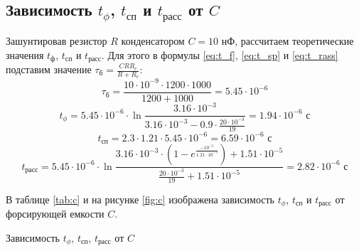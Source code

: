 \documentclass[a4paper,14pt]{extarticle}
\begin{document}
\subsection{Зависимость $t_\phi$, $t_\text{сп}$ и $t_\text{расс}$ от $C$}

Зашунтировав резистор $R$ конденсатором $C = 10$ нФ, рассчитаем теоретические значения $t_\text{ф}$, $t_\text{сп}$ и $t_\text{расс}$. Для этого в формулы \ref{eq:t_f}, \ref{eq:t_sp} и \ref{eq:t_rass} подставим значение $\tau_\text{б} = \frac{CRR_c}{R+R_c}$:
\[
\tau_\text{б} = \frac{10 \cdot 10^{-9} \cdot 1200 \cdot 1000}{1200 + 1000} = 5.45 \cdot 10^{-6}
\]
\[
t_\phi = 5.45 \cdot 10^{-6} \cdot \ln{\frac{3.16 \cdot 10^{-3}}{3.16 \cdot 10^{-3} - 0.9 \cdot \frac{20 \cdot 10^{-3}}{19}}} = 1.94 \cdot 10^{-6} \text{ с}
\]
\[
t_\text{сп} = 2.3 \cdot 1.21 \cdot 5.45 \cdot 10^{-6} = 6.59 \cdot 10^{-6} \text{ с}
\]
\[
t_\text{расс} = 5.45 \cdot 10^{-6} \cdot \ln{\frac{3.16 \cdot 10^{-3} \cdot \left( 1 - e^{\frac{-10^{-5}}{1.21 \cdot 10^{-5}}} \right) + 1.51 \cdot 10^{-5}}{\frac{20 \cdot 10^{-3}}{19} + 1.51 \cdot 10^{-5}}} = 2.82 \cdot 10^{-6} \text{ с}
\]

В таблице \ref{tab:c} и на рисунке \ref{fig:c} изображена зависимость $t_\phi$, $t_\text{сп}$ и $t_\text{расс}$ от форсирующей емкости $C$.

\begin{table}[H]
\begin{center}
	\caption{Зависимость $t_\phi$, $t_\text{сп}$, $t_\text{расс}$ от $C$}\label{tab:c}
	\def\arraystretch{1.3}
	\def\tabcolsep{17pt}
\end{center}
\end{table}
\end{document}
